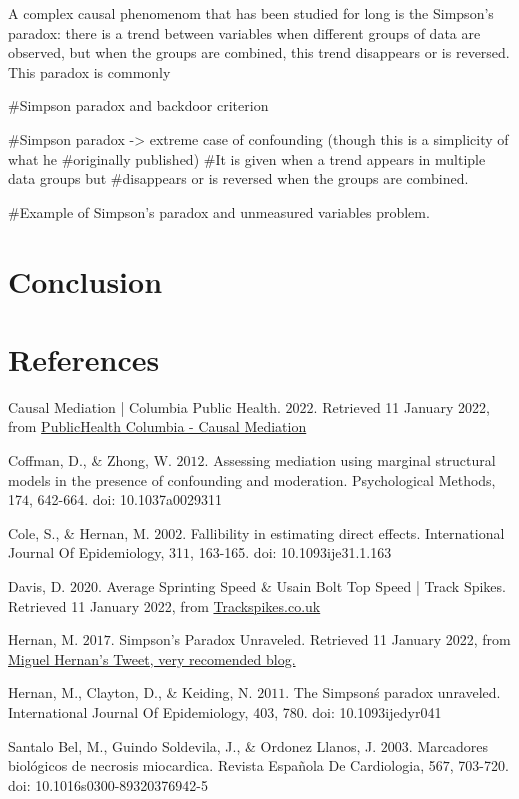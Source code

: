 \documentclass{article}
\begin{document}
A complex causal phenomenom that has been studied for long is the Simpson's paradox: there is a trend between variables when different groups of data are observed, but when the groups are combined, this trend disappears or is reversed. This paradox is commonly 


#Simpson paradox and backdoor criterion

#Simpson paradox -> extreme case of confounding (though this is a simplicity of what he
#originally published)
#It is given when a trend appears in multiple data groups but
#disappears or is reversed when the groups are combined.

#Example of Simpson's paradox and unmeasured variables problem.

\section{Conclusion}

\section{References}

Causal Mediation | Columbia Public Health. \(2022\). Retrieved 11 January 2022, from \href{https://www.publichealth.columbia.edu/research/population-health-methods/causal-mediation}{PublicHealth Columbia - Causal Mediation}

Coffman, D., \& Zhong, W. \(2012\). Assessing mediation using marginal structural models in the presence of confounding and moderation. Psychological Methods, 17\(4\), 642-664. doi: 10.1037\/a0029311

Cole, S., \& Hernan, M. \(2002\). Fallibility in estimating direct effects. International Journal Of Epidemiology, 31\(1\), 163-165. doi: 10.1093\/ije\/31.1.163

Davis, D. \(2020\). Average Sprinting Speed \& Usain Bolt Top Speed | Track Spikes. Retrieved 11 January 2022, from \href{https://trackspikes.co.uk/average-sprinting-speed/#}{Trackspikes.co.uk}

Hernan, M. \(2017\). Simpson's Paradox Unraveled. Retrieved 11 January 2022, from \href{https://twitter.com/_MiguelHernan/status/860542619818106881?s=20}{Miguel Hernan's Tweet, very recomended blog.}

Hernan, M., Clayton, D., \& Keiding, N. \(2011\). The Simpson\'s paradox unraveled. International Journal Of Epidemiology, 40\(3\), 780. doi: 10.1093\/ije\/dyr041

Santalo Bel, M., Guindo Soldevila, J., \& Ordonez Llanos, J. \(2003\). Marcadores biológicos de necrosis miocardica. Revista Española De Cardiologia, 56\(7\), 703-720. doi: 10.1016\/s0300-8932\(03\)76942-5
\end{document}
